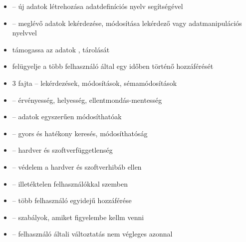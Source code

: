 \documentclass[main.tex]{subfiles}
\begin{document}
  \begin{itemize}
    \item {} – új adatok létrehozása adatdefiníciós
    nyelv segítségével
    
    \item {} – meglévő adatok lekérdezése, módosítása
    lekérdező vagy adatmanipulációs nyelvvel

    \item támogassa az adatok ,
     tárolását

    \item felügyelje a több felhasználó által egy
    időben történő hozzáférését

    \item 3 fajta  \tabto{4.5cm} – \tabto{5.5cm}
    lekérdezések, módosítások, sémamódosítások

    \item {} \tabto{4.5cm} – \tabto{5.5cm}
    érvényesség, helyesség, ellentmondás-mentesség
    
    \item {} \tabto{4.5cm} – \tabto{5.5cm}
    adatok egyszerűen módosíthatóak
    
    \item {} \tabto{4.5cm} – \tabto{5.5cm}
    gyors és hatékony keresés, módosíthatóság
    
    \item {} \tabto{4.5cm} – \tabto{5.5cm}
    hardver és szoftverfüggetlenség
    
    \item {} \tabto{4.5cm} – \tabto{5.5cm}
    védelem a hardver és szoftverhibáb ellen
    
    \item {} \tabto{4.5cm} – \tabto{5.5cm}
    illetéktelen felhasználókkal szemben
    
    \item {} \tabto{4.5cm} – \tabto{5.5cm}
    több felhasználó egyidejű hozzáférése

    \item {} \tabto{5cm} – \tabto{5.5cm}
    szabályok, amiket figyelembe kellm venni

    \item {} \tabto{4.5cm} – \tabto{5.5cm}
    felhasználó általi változtatás nem végleges azonnal
  \end{itemize}
\end{document}
